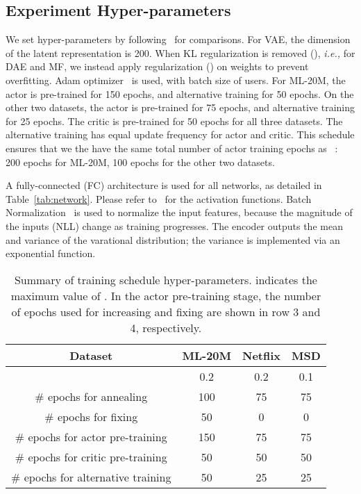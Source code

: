 \documentclass{article} \usepackage{iclr2020_conference,times}
\newcommand{\ie}[0]{\emph{i.e., }}
\begin{document}
\subsection{Experiment Hyper-parameters}
We set hyper-parameters by following~\citet{liang2018variational} for comparisons. For VAE, the dimension of the latent representation is 200. 
When KL regularization is removed (), \ie for DAE and MF, we instead apply  regularization () on weights to prevent overfitting.
Adam optimizer~\citep{kingma2014adam} is used, with batch size of  users. 
For ML-20M, the actor is pre-trained for 150 epochs, and alternative training for 50 epochs. On the other two datasets, the actor is pre-trained for 75 epochs, and alternative training for 25 epochs. The critic is pre-trained for 50 epochs for all three datasets. The alternative training has equal update frequency for actor and critic.
This schedule ensures that we the have the same total number of actor training epochs as ~\citet{liang2018variational}: 200 epochs for ML-20M, 100 epochs for the other two datasets.


A fully-connected (FC) architecture is used for all networks, as detailed in Table~\ref{tab:network}. Please refer to~\citet{goodfellow2016deep} for the activation functions. Batch Normalization~\citep{ioffe2015batch} is used to normalize the input features, 
because the magnitude of the inputs (NLL) change as training progresses. 
The encoder outputs the mean and variance of the varational distribution; the variance is implemented via an exponential function.

\begin{table}[t!]
  \caption{Summary of training schedule hyper-parameters.  indicates the maximum value of . In the actor pre-training stage, the number of epochs used for increasing and fixing  are shown in row 3 and 4, respectively. }
    \centering
  \label{tab:beta}
  \begin{tabular}{c|c|c|c}
    \toprule
    Dataset & ML-20M & Netflix & MSD \\ 
    \midrule  
      &  0.2 &  0.2  &  0.1 \\
    \# epochs for annealing & 100 & 75 & 75 \\
     \# epochs for fixing & 50 & 0  & 0\\ \midrule  
    \# epochs for actor pre-training & 150 & 75 & 75 \\
    \# epochs for critic pre-training & 50 & 50 & 50 \\
    \# epochs for alternative training & 50 & 25 & 25 \\
  \bottomrule
\end{tabular}
\end{table}
\end{document}
